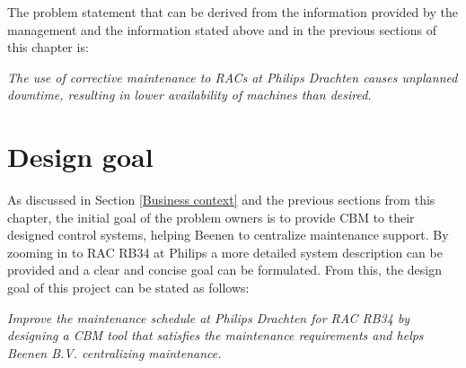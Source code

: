 The problem statement that can be derived from the information provided by the management and the information stated above and in the previous sections of this chapter is:
\begin{center}
\textit{The use of corrective maintenance to RACs at Philips Drachten causes unplanned downtime, resulting in lower availability of machines than desired.}\\
\end{center}

\section{Design goal} \label{Design goal}
As discussed in Section \ref{Business context} and the previous sections from this chapter, the initial goal of the problem owners is to provide CBM to their designed control systems, helping Beenen to centralize maintenance support. By zooming in to RAC RB34 at Philips a more detailed system description can be provided and a clear and concise goal can be formulated. From this, the design goal of this project can be stated as follows:
\begin{center}
\textit{Improve the maintenance schedule at Philips Drachten for RAC RB34 by designing a CBM tool that satisfies the maintenance requirements and helps Beenen B.V. centralizing maintenance.}\\
\end{center}



